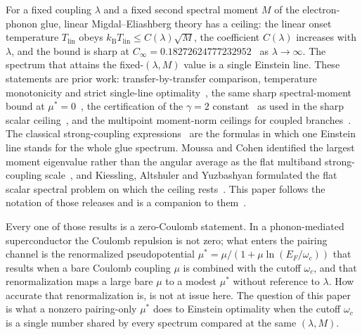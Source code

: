 \documentclass[11pt]{article}
\newcommand{\kb}{k_{\mathrm B}}
\newcommand{\Tlin}{T_{\mathrm{lin}}}
\newcommand{\muS}{\mu^{*}}
\theoremstyle{definition}
\theoremstyle{remark}
\begin{document}
For a fixed coupling $\lambda$ and a fixed second spectral moment $M$ of the
electron-phonon glue, linear Migdal--Eliashberg theory has a ceiling: the linear onset
temperature $\Tlin$ obeys $\kb\Tlin\le C(\lambda)\sqrt M$, the coefficient $C(\lambda)$
increases with $\lambda$, and the bound is sharp at $C_\infty=0.18272624777232952$~\cite{univglue,anisosharp} as
$\lambda\to\infty$. The spectrum that attains the fixed-$(\lambda,M)$ value is a single
Einstein line. These statements are prior work: transfer-by-transfer comparison,
temperature monotonicity and strict single-line optimality~\cite{rens}, the same sharp
spectral-moment bound at $\muS=0$~\cite{kondratev}, the certification of the
$\gamma=2$ constant~\cite{gamma} as used in the sharp scalar
ceiling~\cite{finiteband,gsi}, and the multipoint moment-norm ceilings for coupled
branches~\cite{univglue,optimum,anisosharp,capstone}. The classical strong-coupling
expressions~\cite{mcmillan,allendynes} are the formulas in which one Einstein line stands
for the whole glue spectrum. Moussa and Cohen identified the largest moment eigenvalue
rather than the angular average as the flat multiband strong-coupling
scale~\cite{moussa}, and Kiessling, Altshuler and Yuzbashyan formulated the flat scalar
spectral problem on which the ceiling rests~\cite{kay}. This paper follows the notation of
those releases and is a companion to them~\cite{univglue,optimum,anisosharp,capstone,finiteband,etapair}.

Every one of those results is a zero-Coulomb statement. In a phonon-mediated
superconductor the Coulomb repulsion is not zero; what enters the pairing channel is the
renormalized pseudopotential $\muS=\mu/(1+\mu\ln(E_F/\omega_c))$ that results when a bare
Coulomb coupling $\mu$ is combined with the cutoff $\omega_c$, and that renormalization
maps a large bare $\mu$ to a modest $\muS$ without reference to $\lambda$. How accurate
that renormalization is, is not at issue here. The question of this paper is what a
nonzero pairing-only $\muS$ does to Einstein optimality when the cutoff $\omega_c$ is a
single number shared by every spectrum compared at the same $(\lambda,M)$.
\end{document}
